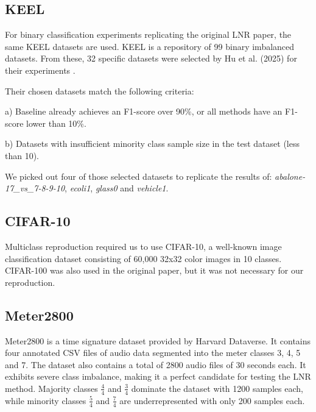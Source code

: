 \documentclass{article}
\begin{document}
\subsection{KEEL}

For binary classification experiments replicating the original LNR paper, the same KEEL datasets are used. KEEL is a repository of 99 binary imbalanced datasets. From these, 32 specific datasets were selected by Hu et al. (2025) for their experiments \cite{keel}.

Their chosen datasets match the following criteria:

a) Baseline already achieves an F1-score over 90\%, or all methods have an F1-score lower than 10\%.

b) Datasets with insufficient minority class sample size in the test dataset (less than 10).

We picked out four of those selected datasets to replicate the results of: \textit{abalone-17\_vs\_7-8-9-10}, \textit{ecoli1}, \textit{glass0} and \textit{vehicle1}.

\subsection{CIFAR-10}

Multiclass reproduction required us to use CIFAR-10, a well-known image classification dataset consisting of 60,000 32x32 color images in 10 classes. CIFAR-100 was also used in the original paper, but it was not necessary for our reproduction.

\subsection{Meter2800}


Meter2800 is a time signature dataset provided by Harvard Dataverse. It contains four annotated CSV files of audio data segmented into the meter classes 3, 4, 5 and 7. The dataset also contains a total of 2800 audio files of 30 seconds each. It exhibits severe class imbalance, making it a perfect candidate for testing the LNR method. Majority classes $\frac{4}{4}$ and $\frac{3}{4}$ dominate the dataset with 1200 samples each, while minority classes $\frac{5}{4}$ and $\frac{7}{4}$ are underrepresented with only 200 samples each.


\end{document}
